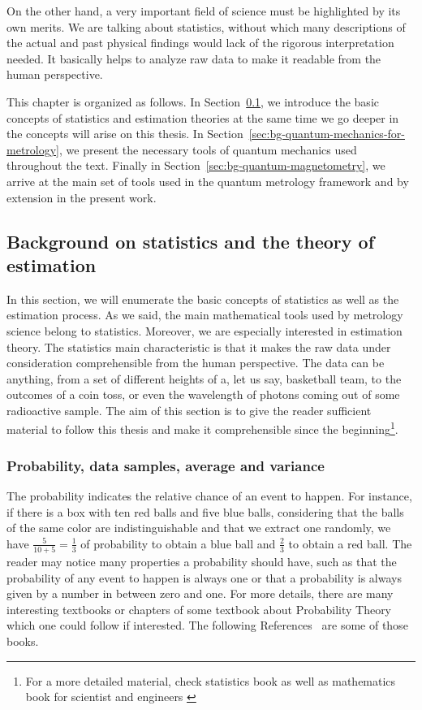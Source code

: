 On the other hand, a very important field of science must be highlighted by its own merits.
We are talking about statistics, without which many descriptions of the actual and past physical findings would lack of the rigorous interpretation needed.
It basically helps to analyze raw data to make it readable from the human perspective.

This chapter is organized as follows.
In Section~\ref{sec:bg-statistics-and-stimation}, we introduce the basic concepts of statistics and estimation theories at the same time we go deeper in the concepts will arise on this thesis.
In Section~\ref{sec:bg-quantum-mechanics-for-metrology}, we present the necessary tools of quantum mechanics used throughout the text.
Finally in Section~\ref{sec:bg-quantum-magnetometry}, we arrive at the main set of tools used in the quantum metrology framework and by extension in the present work.

\subsection{Background on statistics and the theory of estimation}
\label{sec:bg-statistics-and-stimation}

In this section, we will enumerate the basic concepts of statistics as well as the estimation process.
As we said, the main mathematical tools used by metrology science belong to statistics.
Moreover, we are especially interested in estimation theory.
The statistics main characteristic is that it makes the raw data under consideration comprehensible from the human perspective.
The data can be anything, from a set of different heights of a, let us say, basketball team, to the outcomes of a coin toss, or even the wavelength of photons coming out of some radioactive sample.
The aim of this section is to give the reader sufficient material to follow this thesis and make it comprehensible since the beginning\footnote{
For a more detailed material, check statistics book as well as mathematics book for scientist and engineers \citep{Riley1998, BarlowXXXX}}.

\subsubsection{Probability, data samples, average and variance}

The probability indicates the relative chance of an event to happen.
For instance, if there is a box with ten red balls and five blue balls, considering that the balls of the same color are indistinguishable and that we extract one randomly, we have $\frac{5}{10+5}=\frac{1}{3}$ of probability to obtain a blue ball and $\frac{2}{3}$ to obtain a red ball.
The reader may notice many properties a probability should have, such as that the probability of any event to happen is always one or that a probability is always given by a number in between zero and one.
For more details, there are many interesting textbooks or chapters of some textbook about Probability Theory which one could follow if interested.
The following References~\citep{Riley1998, BarlowXXXX} are some of those books.

